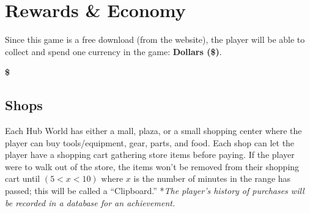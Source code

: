 \documentclass[12pt]{article}
\begin{document}

\onecolumn

\section{Rewards \& Economy}
\noindent Since this game is a free download (from the website), the player will be able to collect and spend one currency in the game: \textbf{Dollars (\$)}. %
\begin{center}
\textbf{\Huge \$}
\end{center}
\subsection{Shops}
\noindent Each Hub World has either a mall, plaza, or a small shopping center where the player can buy tools/equipment, gear, parts, and food. \newline \newline
Each shop can let the player have a shopping cart gathering store items before paying. If the player were to walk out of the store, the items won't be removed from their shopping cart until $(5 < x < 10) \textrm{ where } x$ is the number of minutes in the range has passed; this will be called a ``Clipboard.'' \newline \newline
*\textit{The player's history of purchases will be recorded in a database for an achievement.}
\end{document}
